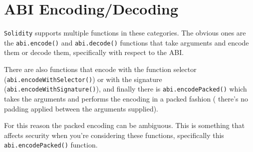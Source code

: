 \section{ABI Encoding/Decoding}\label{abi-encodingdecoding}

\texttt{Solidity} supports multiple functions in these categories. The
obvious ones are the \texttt{abi.encode()} and \texttt{abi.decode()}
functions that take arguments and encode them or decode them,
specifically with respect to the ABI.

There are also functions that encode with the function selector
(\texttt{abi.encodeWithSelector()}) or with the signature
(\texttt{abi.encodeWithSignature()}), and finally there is
\texttt{abi.encodePacked()} which takes the arguments and performs the
encoding in a packed fashion ( there's no padding applied between the
arguments supplied).

For this reason the packed encoding can be ambiguous. This is something
that affects security when you're considering these functions,
specifically this \texttt{abi.encodePacked()} function.
